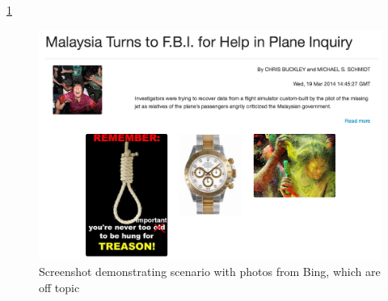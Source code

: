 \documentclass{acm_proc_10ptArticle-sp}
\begin{document}
\ref{screenshot:limitation}
\begin{figure}[H]
  \centering
  \includegraphics[width=0.9\linewidth]{img/limitation-ZK.png}
  \caption{Screenshot demonstrating scenario with photos from Bing, which are off topic}
  \label{screenshot:limitation}
\end{figure}







\end{document}
